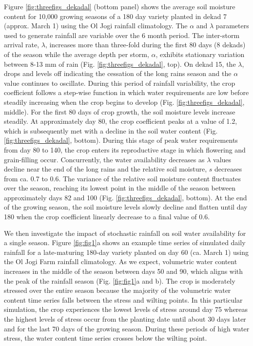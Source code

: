 Figure \ref{fig:threefigs_dekadal} (bottom panel) shows the average soil moisture content for 10,000 growing seasons of a 180 day variety planted in dekad 7 (approx. March 1) using the Ol Jogi rainfall climatology. The $\alpha$ and $\lambda$ parameters used to generate rainfall are variable over the 6 month period. The inter-storm arrival rate, $\lambda$, increases more than three-fold during the first 80 days (8 dekads) of the season while the average depth per storm, $\alpha$, exhibits stationary variation between 8-13 mm of rain (Fig. \ref{fig:threefigs_dekadal}, top). On dekad 15, the $\lambda$, drops and levels off indicating the cessation of the long rains season and the  $\alpha$ value continues to oscillate. During this period of rainfall variability, the crop coefficient follows a step-wise function in which water requirements are low before steadily increasing when the crop begins to develop (Fig. \ref{fig:threefigs_dekadal}, middle). For the first 80 days of crop growth, the soil moisture levels increase steadily. At approximately day 80, the crop coefficient peaks at a value of 1.2, which is subsequently met with a decline in the soil water content (Fig. \ref{fig:threefigs_dekadal}, bottom). During this stage of peak water requirements from day 80 to 140, the crop enters its reproductive stage in which flowering and grain-filling occur. Concurrently, the water availability decreases as $\lambda$ values decline near the end of the long rains and the relative soil moisture, $s$ decreases from ca. 0.7 to 0.6. The variance of the relative soil moisture content fluctuates over the season, reaching its lowest point in the middle of the season between approximately days 82 and 100 (Fig. \ref{fig:threefigs_dekadal}, bottom). At the end of the growing season, the soil moisture levels slowly decline and flatten until day 180 when the crop coefficient linearly decrease to a final value of 0.6.

We then investigate the impact of stochastic rainfall on soil water availability for a single season. Figure \ref{fig:fig1}a shows an example time series of simulated daily rainfall for a late-maturing 180-day variety planted on day 60 (ca. March 1) using the Ol Jogi Farm rainfall climatology.  As we expect, volumetric water content increases in the middle of the season between days 50 and 90, which aligns with the peak of the rainfall season (Fig. \ref{fig:fig1}a and b).  The crop is moderately stressed over the entire season because the majority of the volumetric water content time series falls between the stress and wilting points. In this particular simulation, the crop experiences the lowest levels of stress  around day 75 whereas the highest levels of stress occur from the planting date until about 30 days later and for the last 70 days of the growing season. During these periods of high water stress, the water content time series crosses below the wilting point. %

